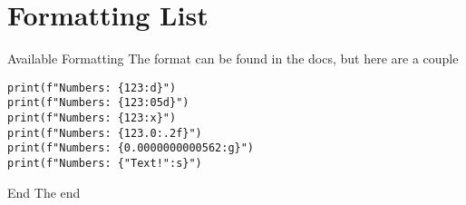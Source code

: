 \section{Formatting List}
\begin{frame}[containsverbatim]{Available Formatting}
    The format can be found in the docs, but here are a couple
    \begin{verbatim}
print(f"Numbers: {123:d}")
print(f"Numbers: {123:05d}")
print(f"Numbers: {123:x}")
print(f"Numbers: {123.0:.2f}")
print(f"Numbers: {0.0000000000562:g}")
print(f"Numbers: {"Text!":s}")
    \end{verbatim}
\end{frame}

\begin{frame}[standout]{End}
  The end
\end{frame}



